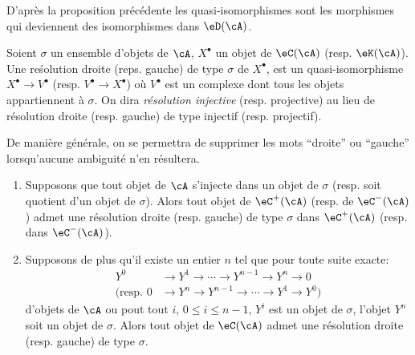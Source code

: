 D'après la proposition précédente les quasi-isomorphismes sont les 
morphismes qui deviennent des isomorphismes dans $\eD(\cA)$. 





\begin{definition}\label{VIII:3-1-8}
Soient $\sigma$ un ensemble d'objets de $\cA$, $X^\bullet$ un objet de 
$\eC(\cA)$ (resp. $\eK(\cA)$). Une re\'solution droite (reps. gauche) de type 
$\sigma$ de $X^\bullet$, est un quasi-isomorphisme $X^\bullet \to V^\bullet$ 
(resp. $V^\bullet \to X^\bullet$) où $V^\bullet$ est un complexe dont tous 
les objets appartiennent à $\sigma$. On dira \emph{résolution injective} 
(resp. projective) au lieu de résolution droite (resp. gauche) de type 
injectif (resp. projectif). 
\end{definition}

De manière générale, on se permettra de supprimer les mots ``droite'' ou 
``gauche'' lorsqu'aucune ambiguité n'en résultera. 





\begin{proposition}\label{VIII:3-1-9}
\begin{enumerate}
  \item Supposons que tout objet de $\cA$ s'injecte dans un objet de $\sigma$ 
    (resp. soit quotient d'un objet de $\sigma$). Alors tout objet de 
    $\eC^+(\cA)$ (resp. de $\eC^-(\cA)$) admet une résolution droite 
    (resp. gauche) de type $\sigma$ dans $\eC^+(\cA)$ (resp. dans 
    $\eC^-(\cA)$). 
  \item Supposons de plus qu'il existe un entier $n$ tel que pour toute suite 
    exacte: 
    \begin{align*}
      Y^0 &\to Y^1 \to \cdots \to Y^{n-1} \to Y^n \to 0 \\
      \text{(resp. } 0 &\to Y^n \to Y^{n-1} \to \cdots \to Y^1 \to Y^0 \text{)} 
    \end{align*}
    d'objets de $\cA$ ou pout tout $i$, $0\leqslant i\leqslant n-1$, $Y^i$ est 
    un objet de $\sigma$, l'objet $Y^n$ soit un objet de $\sigma$. Alors tout 
    objet de $\eC(\cA)$ admet une résolution droite (resp. gauche) de type 
    $\sigma$. 
\end{enumerate}
\end{proposition}











